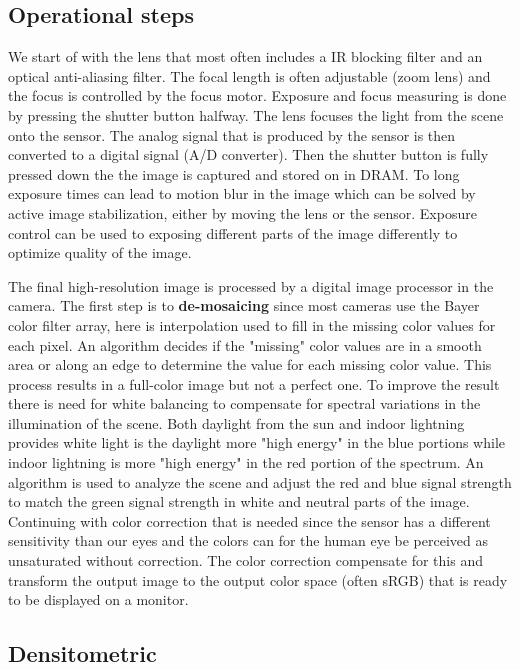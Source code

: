 \subsection{Operational steps}
We start of with the lens that most often includes a IR blocking filter and an optical anti-aliasing filter. The focal length is often adjustable (zoom lens) and the focus is controlled by the focus motor. Exposure and focus measuring is done by pressing the shutter button halfway. The lens focuses the light from the scene onto the sensor. The analog signal that is produced by the sensor is then converted to a digital signal (A/D converter). Then the shutter button is fully pressed down the the image is captured and stored on in DRAM. To long exposure times can lead to motion blur in the image which can be solved by active image stabilization, either by moving the lens or the sensor. Exposure control can be used to exposing different parts of the image differently to optimize quality of the image. 


The final high-resolution image is processed by a digital image processor in the camera. The first step is to \textbf{de-mosaicing} since most cameras use the Bayer color filter array, here is interpolation used to fill in the missing color values for each pixel. An algorithm decides if the "missing" color values are in a smooth area or along an edge to determine the value for each missing color value. This process results in a full-color image but not a perfect one. To improve the result there is need for white balancing to compensate for spectral variations in the illumination of the scene. Both daylight from the sun and indoor lightning provides white light is the daylight more "high energy" in the blue portions while indoor lightning is more "high energy" in the red portion of the spectrum. An algorithm is used to analyze the scene and adjust the red and blue signal strength to match the green signal strength in white and neutral parts of the image. Continuing with color correction that is needed since the sensor has a different sensitivity than our eyes and the colors can for the human eye be perceived as unsaturated without correction. The color correction compensate for this and transform the output image to the output color space (often sRGB) that is ready to be displayed on a monitor.  


\subsection{Densitometric}

